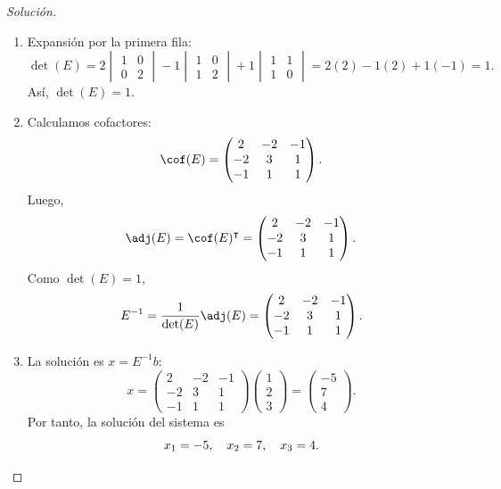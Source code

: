 \documentclass[a4,11pt]{aleph-notas}
\begin{document}
\begin{proof}[Solución]\hspace{0pt}
    \begin{enumerate}
    \item
        Expansión por la primera fila:
        \[
            \det(E)=2\begin{vmatrix}1 & 0 \\ 0 & 2\end{vmatrix}-1\begin{vmatrix}1 & 0 \\ 1 & 2\end{vmatrix}+1\begin{vmatrix}1 & 1 \\ 1 & 0\end{vmatrix}=2(2)-1(2)+1(-1)=1.
        \]
        Así, $\det(E)=1$.
    \item
        Calculamos cofactores:
        \[
            \cof(E)=
            \begin{pmatrix}
                2 & -2 & -1 \\
                -2 & 3 & 1 \\
                -1 & 1 & 1
            \end{pmatrix}.
        \]
        Luego,
        \[
            \adj(E)=\cof(E)^\intercal=
            \begin{pmatrix}
                2 & -2 & -1 \\
                -2 & 3 & 1 \\
                -1 & 1 & 1
            \end{pmatrix}.
        \]
        Como $\det(E)=1$,
        \[
            E^{-1}=\frac{1}{\det(E)}\adj(E)=
            \begin{pmatrix}
                2 & -2 & -1 \\
                -2 & 3 & 1 \\
                -1 & 1 & 1
            \end{pmatrix}.
        \]
    \item
        La solución es $x=E^{-1}b$:
        \[
            x=
            \begin{pmatrix}
                2 & -2 & -1 \\
                -2 & 3 & 1 \\
                -1 & 1 & 1
            \end{pmatrix}
            \begin{pmatrix}
                1 \\
                2 \\
                3
            \end{pmatrix}
            =
            \begin{pmatrix}
                -5 \\
                7 \\
                4
            \end{pmatrix}.
        \]
        Por tanto, la solución del sistema es
        \[
            x_1=-5,\quad x_2=7,\quad x_3=4.\qedhere
        \]
    \end{enumerate}
\end{proof}
\end{document}
